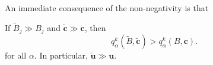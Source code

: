 \documentclass[a4paper]{article}
\begin{document}
An immediate consequence of the non-negativity is that
\begin{lemma}
  If $\tilde{B}_j \gg B_j$ and $\tilde{\mathbf{c}} \gg \mathbf{c}$, then
  \[
    q_\alpha^k(\tilde{B}, \tilde{\mathbf{c}}) > q_\alpha^k(B, \mathbf{c}).
  \]
  for all $\alpha$. In particular, $\tilde{\mathbf{u}} \gg \mathbf{u}$.
\end{lemma}

%
%
%
\end{document}
